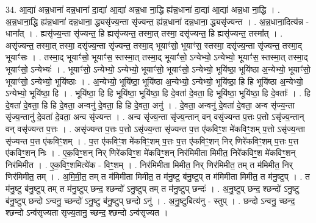 \documentclass[17pt]{extarticle}
\begin{document}
34. आ॒द्या॑ अन्न॒धाना॑ दन्न॒धाना॑ दा॒द्या॑ आ॒द्या॑ अन्न॒धा ना॒द्धि ह्य॑न्न॒धाना॑ दा॒द्या॑ आ॒द्या॑ अन्न॒धा ना॒द्धि । . अ॒न्न॒धाना॒द्धि ह्य॑न्न॒धाना॑ दन्न॒धाना॒ द्ध्यसृ॑ज्य॒न्ता सृ॑ज्यन्त॒ ह्य॑न्न॒धाना॑ दन्न॒धाना॒
द्ध्यसृ॑ज्यन्त । . अ॒न्न॒धाना॒दित्य॑न्न - धाना᳚त् । . ह्यसृ॑ज्य॒न्ता सृ॑ज्यन्त॒ हि ह्यसृ॑ज्यन्त॒ तस्मा॒त् तस्मा॒ दसृ॑ज्यन्त॒ हि ह्यसृ॑ज्यन्त॒ तस्मा᳚त् । . असृ॑ज्यन्त॒ तस्मा॒त् तस्मा॒ दसृ॑ज्य॒न्ता सृ॑ज्यन्त॒ तस्मा॒द् भूयाꣳ॑सो॒ भूयाꣳ॑स॒ स्तस्मा॒ दसृ॑ज्य॒न्ता सृ॑ज्यन्त॒ तस्मा॒द् भूयाꣳ॑सः । . तस्मा॒द् भूयाꣳ॑सो॒ भूयाꣳ॑स॒ स्तस्मा॒त् तस्मा॒द् भूयाꣳ॑सो॒ ऽन्येभ्यो॒ ऽन्येभ्यो॒ भूयाꣳ॑स॒ स्तस्मा॒त् तस्मा॒द् भूयाꣳ॑सो॒ ऽन्येभ्यः॑ । . भूयाꣳ॑सो॒ ऽन्येभ्यो॒ ऽन्येभ्यो॒ भूयाꣳ॑सो॒ भूयाꣳ॑सो॒ ऽन्येभ्यो॒ भूयि॑ष्ठा॒ भूयि॑ष्ठा अ॒न्येभ्यो॒ भूयाꣳ॑सो॒ भूयाꣳ॑सो॒ ऽन्येभ्यो॒ भूयि॑ष्ठाः । . अ॒न्येभ्यो॒ भूयि॑ष्ठा॒ भूयि॑ष्ठा अ॒न्येभ्यो॒ ऽन्येभ्यो॒ भूयि॑ष्ठा॒ हि हि भूयि॑ष्ठा अ॒न्येभ्यो॒ ऽन्येभ्यो॒ भूयि॑ष्ठा॒ हि । . भूयि॑ष्ठा॒ हि हि भूयि॑ष्ठा॒ भूयि॑ष्ठा॒ हि दे॒वता॑ दे॒वता॒ हि भूयि॑ष्ठा॒ भूयि॑ष्ठा॒ हि दे॒वताः᳚ । . हि दे॒वता॑ दे॒वता॒ हि हि दे॒वता॒ अन्वनु॑ दे॒वता॒ हि हि दे॒वता॒ अनु॑ । . दे॒वता॒ अन्वनु॑ दे॒वता॑ दे॒वता॒ अन्व सृ॑ज्य॒न्ता सृ॑ज्य॒न्तानु॑ दे॒वता॑ दे॒वता॒ अन्व सृ॑ज्यन्त । . अन्व सृ॑ज्य॒न्ता सृ॑ज्य॒न्तान् वन् वसृ॑ज्यन्त प॒त्तः प॒त्तो ऽसृ॑ज्य॒न्तान् वन् वसृ॑ज्यन्त प॒त्तः । . असृ॑ज्यन्त प॒त्तः प॒त्तो ऽसृ॑ज्य॒न्ता सृ॑ज्यन्त प॒त्त ए॑कविꣳ॒॒श मे॑कविꣳ॒॒शम् प॒त्तो ऽसृ॑ज्य॒न्ता सृ॑ज्यन्त प॒त्त ए॑कविꣳ॒॒शम् । . प॒त्त ए॑कविꣳ॒॒श मे॑कविꣳ॒॒शम् प॒त्तः प॒त्त ए॑कविꣳ॒॒शन् निर् णिरे॑कविꣳ॒॒शम् प॒त्तः प॒त्त ए॑कविꣳ॒॒शन् निः । . ए॒क॒विꣳ॒॒शन् निर् णिरे॑कविꣳ॒॒श मे॑कविꣳ॒॒शन् निर॑मिमीता मिमीत॒ निरे॑कविꣳ॒॒श मे॑कविꣳ॒॒शन् निर॑मिमीत । . ए॒क॒विꣳ॒॒शमित्ये॑क - विꣳ॒॒शम् । . निर॑मिमीता मिमीत॒ निर् णिर॑मिमीत॒ तम् त म॑मिमीत॒ निर् णिर॑मिमीत॒ तम् । . अ॒मि॒मी॒त॒ तम् त म॑मिमीता मिमीत॒ त म॑नु॒ष्टु ब॑नु॒ष्टुप् त म॑मिमीता मिमीत॒ त म॑नु॒ष्टुप् । . त म॑नु॒ष्टु ब॑नु॒ष्टुप् तम् त म॑नु॒ष्टुप् छन्द॒ श्छन्दो॑ ऽनु॒ष्टुप् तम् त म॑नु॒ष्टुप् छन्दः॑ । . अ॒नु॒ष्टुप् छन्द॒ श्छन्दो॑ ऽनु॒ष्टु ब॑नु॒ष्टुप् छन्दो ऽन्वनु॒ च्छन्दो॑ ऽनु॒ष्टु ब॑नु॒ष्टुप् छन्दो ऽनु॑ । . अ॒नु॒ष्टुबित्य॑नु - स्तुप् । . छन्दो ऽन्वनु॒ च्छन्द॒ श्छन्दो ऽन्व॑सृज्यता सृज्य॒तानु॒ च्छन्द॒ श्छन्दो ऽन्व॑सृज्यत । \newline
\pagebreak
{}
\end{document}
